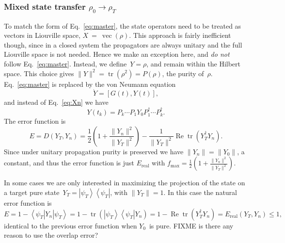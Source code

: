 \documentclass[aps, pra, a4paper, longbibliography, superscriptaddress]{revtex4-1}
\newcommand{\be}{\begin{equation}}
\newcommand{\ee}{\end{equation}}
\newcommand{\ket}[1]{\left| #1 \right \rangle}
\newcommand{\bra}[1]{\left \langle #1 \right|}
\newcommand{\braket}[2]{\left \langle #1 | #2 \right \rangle}
\newcommand{\ketbra}[2]{\left| #1 \right \rangle \left \langle #2 \right|}
\newcommand{\comm}[2]{\left[ #1, #2 \right]}
\DeclareMathOperator{\tr}{tr}
\DeclareMathOperator{\re}{Re}
\DeclareMathOperator{\cvec}{vec}
\newcommand{\Xt}{X_T}  %
\newcommand{\Xn}{X_n}  %
\begin{document}
\subsubsection{Mixed state transfer $\rho_0 \to \rho_T$}
\label{sec:closed-mixed}

To match the form of Eq.~\eqref{eq:master},
the state operators need to be treated as vectors in Liouville space,
$X~=~\cvec(\rho)$.
This approach is fairly inefficient though, since in a closed system the
propagators are always unitary and the full Liouville space is not
needed. Hence we make an exception here, and \emph{do not} follow Eq.~\eqref{eq:master}.
Instead, we define~$Y = \rho$, and remain within the Hilbert space.
This choice gives $\|Y\|^2 = \tr(\rho^2) = P(\rho)$, the purity of~$\rho$.
Eq.~\eqref{eq:master} is replaced by the von Neumann equation
\be
\label{eq:vonneumann}
\dot{Y} = \comm{G(t)}{Y(t)},
\ee
and instead of Eq.~\eqref{eq:Xn} we have
\be
Y(t_k) = P_k \cdots P_1 Y_0 P_1^\dagger \cdots P_k^\dagger.
\ee
The error function is
\be
E
= D(Y_T, Y_n)
= \frac{1}{2}\left(1 +\frac{\|Y_n\|^2}{\|Y_T\|^2}\right) -\frac{1}{\|Y_T\|^2} \re \tr(Y_T^\dagger Y_n).
\ee
Since under unitary propagation purity is preserved we have
$\|Y_n\| = \|Y_0\|$, a constant, and thus the error function is just $E_\text{real}$ with
$f_{\text{max}} = \frac{1}{2}\left(1 +\frac{\|Y_n\|^2}{\|Y_T\|^2}\right)$.

\begin{comment}
Another option would be to use the $\cvec$-representation $X = \cvec(\rho)$.
$\|X\|^2$~is equivalent to the purity of the state:
\be
\|X\|^2
= \|\cvec(\rho)\|^2
= \|\rho\|^2
= \tr(\rho^2)
= P(\rho).
\ee
Unitary propagation conserves purity, hence $\|\Xn\|$~is constant and we may
simply maximize the fidelity
\be
f(\Xt, \Xn)
= \frac{1}{\|\Xt\|} (\re) \tr(\Xt^\dagger \Xn)
\ee
Furthermore, the fidelity is strictly nonnegative since the
state operators are positive:
\be
0 \le f(\Xt, \Xn) \le \sqrt{\frac{P(\rho_0)}{P(\rho_T)}}.
\ee
If either $\rho_T$ or $\rho_0$ is pure,
$\rho = \ketbra{\psi}{\psi}$,
we have $\|\rho\|^2 = \braket{\psi}{\psi}^2 = 1$, and
the diagram simplifies by splitting up.
\end{comment}

In some cases we are only interested in maximizing the projection of
the state on a target pure state~$Y_T = \ketbra{\psi_T}{\psi_T}$,
with $\|Y_T\| = 1$. In this case the natural error function is
\be
E
= 1 -\bra{\psi_T} Y_n \ket{\psi_T}
= 1 -\tr\left(\ketbra{\psi_T}{\psi_T} Y_n \right)
= 1 -\re \tr\left(Y_T^\dagger Y_n\right)
= E_\text{real}(Y_T, Y_n) \le 1,
\ee
identical to the previous error function when $Y_0$~is pure.
FIXME is there any reason to use the overlap error?
\end{document}
